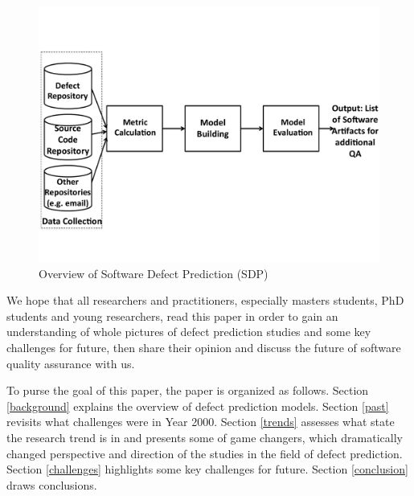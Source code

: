 

\begin{figure}
  \centering
  \includegraphics[trim=0 60 0 80, scale=0.5,clip] {figures/overview}
  \caption{Overview of Software Defect Prediction (SDP)~\cite{Shihab2012PhD} \label{fig:overview}}
\end{figure}

 We hope that all researchers and practitioners, especially masters students, PhD students and young researchers, read this paper in order to gain an understanding of whole pictures of defect prediction studies and some key challenges for future, then share their opinion and discuss the future of software quality assurance with us.

 To purse the goal of this paper, the paper is organized as follows. 
Section \ref{background} explains the overview of defect prediction models.
Section \ref{past} revisits what challenges were in Year 2000.
Section \ref{trends} assesses what state the research trend is in and presents some of game changers, which dramatically changed perspective and direction of the studies in the field of defect prediction.
Section \ref{challenges} highlights some key challenges for future.
Section \ref{conclusion} draws conclusions.
